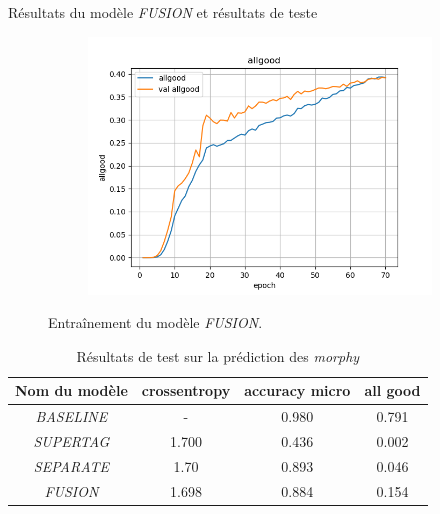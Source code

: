 \documentclass[11pt]{beamer}
\begin{document}
\begin{frame}{Résultats du modèle \textit{FUSION} et résultats de teste}
\begin{figure}
\begin{subfigure}{0.32\textwidth}
            \centering
            \includegraphics[width=\linewidth]{../logs/fusion/allgood.png}
        \end{subfigure}
        \caption{Entraînement du modèle \textit{FUSION}.}
        \label{fig: results fusion}
    \end{figure}

    \begin{table}
        \centering
        \begin{tabular}{|c|c|c|c|}
            \hline
             Nom du modèle & crossentropy & accuracy micro & all good\\
             \hline
             \textit{BASELINE}& - & 0.980 & 0.791 \\
             \hline
             \textit{SUPERTAG}& 1.700 & 0.436 & 0.002\\
             \hline
             \textit{SEPARATE}& 1.70 & 0.893 & 0.046\\
             \hline
             \textit{FUSION}& 1.698 & 0.884 & 0.154 \\
             \hline
        \end{tabular}
        \caption{Résultats de test sur la prédiction des \textit{morphy}}
        \label{tab: test morphy}
    \end{table}
\end{frame}

\begin{frame}
    
\end{frame}

\begin{frame}
    
\end{frame}

\begin{frame}
    
\end{frame}
\end{document}
